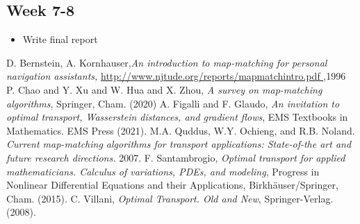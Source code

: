 \documentclass{article}
\numberwithin{equation}{section}
\theoremstyle{definition}
\begin{document}

\subsection*{Week 7-8}
\begin{itemize}[noitemsep]
    \item Write final report
\end{itemize}

\newpage

%  
\begin{thebibliography}{AA}
  D. Bernstein, A. Kornhauser,\textit{An introduction to map-matching for personal navigation assistants,} \url{http://www.njtude.org/reports/mapmatchintro.pdf },1996
 P. Chao and  Y. Xu and  W. Hua and X. Zhou, \textit{ A survey on map-matching algorithms}, Springer, Cham. (2020)
 A. Figalli and F. Glaudo, \textit{An invitation to optimal transport, Wasserstein distances, and gradient flows}, EMS Textbooks in Mathematics. EMS Press (2021).
 M.A. Quddus, W.Y. Ochieng, and R.B. Noland. \textit{Current map-matching algorithms for transport applications: State-of-the art and future research directions.} 2007.
 F. Santambrogio, \textit{Optimal transport for applied mathematicians. Calculus of variations, PDEs, and modeling}, Progress in Nonlinear Differential Equations and their Applications, Birkhäuser/Springer, Cham. (2015).
 C. Villani, \textit{Optimal Transport. Old and New}, Springer-Verlag. (2008).
\end{thebibliography}
\end{document}
